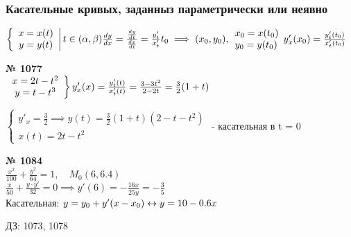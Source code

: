\documentclass[12pt]{article}
\newenvironment{task}[1][0]{\vspace{.5cm} {\textbf{№ #1} \vspace{.5cm}\\ }\large}{}
\begin{document}
{\newpage
\subsubsection{Касательные кривых, заданныз параметрически или неявно}

\large{
$
\left\{
\begin{array}{c}
	x=x(t)\\
	y=y(t)\\
\end{array}\right|
t \in (\alpha, \beta)\\
\frac{dy}{dx}=\frac{\frac{dy}{dt}}{\frac{dx}{dt}}=\frac{y_t'}{x_t'}\\
t_0 \implies (x_0, y_0), 
\begin{array}{l}
	x_0=x(t_0)\\
	y_0=y(t_0)\\
\end{array}\\
y'_x(x_0)=\frac{y_t'(t_0)}{x_t'(t_0)}
$
}

\vspace{.5cm}

\begin{task}[1077]
$
\left.
\begin{array}{c}
	x=2t-t^2\\
	y=t-t^3\\
\end{array}
\right\}\\
y'_x(x)=\frac{y_t'(t)}{x_t'(t)}=\frac{3-3t^2}{2-2t}=\frac{3}{2}(1+t)
$

$
\begin{cases}
	y'_x=\frac{3}{2} \implies y(t)=\frac{3}{2}(1+t)(2-t-t^2)\\
	x(t)=2t-t^2
\end{cases}
$ - касательная в t = 0\\


\end{task}

\begin{task}[1084]
$\frac{x^2}{100}+\frac{y^2}{64}=1, \quad M_0(6, 6.4)$\\
$\frac{x}{50} + \frac{y \cdot y'}{32}=0 \implies y'(6)=-\frac{16x}{25y}=-\frac{3}{5}$\\
Касательная: $y=y_0+y'(x-x_0) \leftrightarrow y=10-0.6x\\$
\end{task}

\vspace{1cm}
ДЗ: 1073, 1078

\newpage
}
\end{document}
